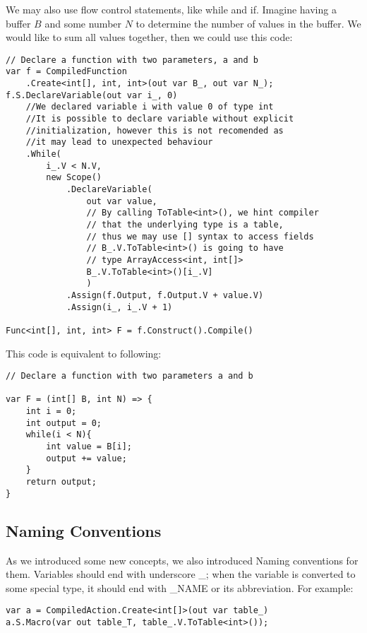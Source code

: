 We may also use flow control statements, like while and if. Imagine having a buffer $B$ and some number $N$ to determine the number of values in the buffer.  We would like to sum all values together, then we could use this code:
\begin{lstlisting}
// Declare a function with two parameters, a and b
var f = CompiledFunction
    .Create<int[], int, int>(out var B_, out var N_);
f.S.DeclareVariable(out var i_, 0)
    //We declared variable i with value 0 of type int
    //It is possible to declare variable without explicit
    //initialization, however this is not recomended as
    //it may lead to unexpected behaviour
    .While(
        i_.V < N.V, 
        new Scope()
            .DeclareVariable(
                out var value,
                // By calling ToTable<int>(), we hint compiler
                // that the underlying type is a table,
                // thus we may use [] syntax to access fields
                // B_.V.ToTable<int>() is going to have 
                // type ArrayAccess<int, int[]> 
                B_.V.ToTable<int>()[i_.V]
                )
            .Assign(f.Output, f.Output.V + value.V)
            .Assign(i_, i_.V + 1)

Func<int[], int, int> F = f.Construct().Compile()
\end{lstlisting}
This code is equivalent to following:
\begin{lstlisting}
// Declare a function with two parameters a and b

var F = (int[] B, int N) => {
    int i = 0;
    int output = 0;
    while(i < N){
        int value = B[i];
        output += value;
    }
    return output;
}
\end{lstlisting}
\subsection{Naming Conventions}
As we introduced some new concepts, we also introduced Naming conventions for them. Variables should end with underscore \_; when the variable is converted to some special type, it should end with \_NAME or its abbreviation. For example:
\begin{lstlisting}
var a = CompiledAction.Create<int[]>(out var table_)
a.S.Macro(var out table_T, table_.V.ToTable<int>());
\end{lstlisting}

